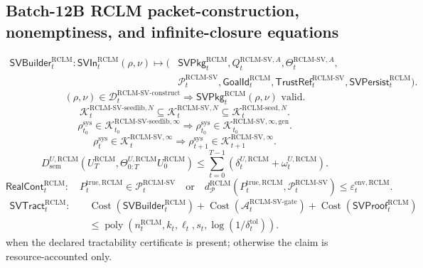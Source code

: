 \documentclass[11pt,a4paper]{article}
\newcommand{\Pcal}{\mathcal P}
\newcommand{\Acal}{\mathcal A}
\newcommand{\Kcal}{\mathcal K}
\newcommand{\Dcal}{\mathcal D}
\newcommand{\RCLM}{\mathrm{RCLM}}
\newcommand{\sem}{\mathrm{sem}}
\newcommand{\sys}{\mathrm{sys}}
\newcommand{\true}{\mathrm{true}}
\newcommand{\Cost}{\operatorname{Cost}}
\newcommand{\gate}{\mathrm{gate}}
\begin{document}
\subsection*{Batch-12B RCLM packet-construction, nonemptiness, and infinite-closure equations}
\[
\begin{aligned}
\mathsf{SVBuilder}_t^{\RCLM}:
\mathsf{SVIn}_t^{\RCLM}(\rho,\nu)
\mapsto
(&\mathsf{SVPkg}_t^{\RCLM},Q_t^{\RCLM\text{-}\mathrm{SV},A},
\Theta_t^{\RCLM\text{-}\mathrm{SV},A},\\
&\Pcal_t^{\RCLM\text{-}\mathrm{SV}},
\mathsf{GoalId}_t^{\RCLM},
\mathsf{TrustRef}_t^{\RCLM\text{-}\mathrm{SV}},
\mathsf{SVPersist}_t^{\RCLM}).
\end{aligned}
\]
\[
(\rho,\nu)\in\Dcal_t^{\RCLM\text{-}\mathrm{SV\mbox{-}construct}}
\Longrightarrow
\mathsf{SVPkg}_t^{\RCLM}(\rho,\nu)\text{ valid}.
\]
\[
\Kcal_t^{\RCLM\text{-}\mathrm{SV\mbox{-}seedlib},N}
\subseteq
\Kcal_t^{\RCLM\text{-}\mathrm{SV},N}
\subseteq
\Kcal_t^{\RCLM\text{-}\mathrm{seed},N}.
\]
\[
\rho_{t_0}^{\sys}\in\Kcal_{t_0}^{\RCLM\text{-}\mathrm{SV\mbox{-}seedlib},\infty}
\Longrightarrow
\rho_{t_0}^{\sys}\in\Kcal_{t_0}^{\RCLM\text{-}\mathrm{SV},\infty,\mathrm{gen}}.
\]
\[
\rho_t^{\sys}\in\Kcal_t^{\RCLM\text{-}\mathrm{SV},\infty}
\Longrightarrow
\rho_{t+1}^{\sys}\in\Kcal_{t+1}^{\RCLM\text{-}\mathrm{SV},\infty}.
\]
\[
D_{\sem}^{U,\RCLM}(U_T^{\RCLM},\Theta_{0:T}^{U,\RCLM}U_0^{\RCLM})
\le
\sum_{t=0}^{T-1}(\delta_t^{U,\RCLM}+\omega_t^{U,\RCLM}).
\]
\[
\mathsf{RealCont}_t^{\RCLM}:
\quad
P_t^{\true,\RCLM}\in\Pcal_t^{\RCLM\text{-}\mathrm{SV}}
\quad\text{or}\quad
 d_{\Pcal}^{\RCLM}(P_t^{\true,\RCLM},\Pcal_t^{\RCLM\text{-}\mathrm{SV}})\le\varepsilon_t^{\mathrm{env},\RCLM}.
\]
\[
\begin{aligned}
\mathsf{SVTract}_t^{\RCLM}:\quad
&\Cost(\mathsf{SVBuilder}_t^{\RCLM})+
\Cost(\Acal_t^{\RCLM\text{-}\mathrm{SV}\text{-}\gate})+
\Cost(\mathsf{SVProof}_t^{\RCLM})\\
&\le
\operatorname{poly}(n_t^{\RCLM},k_t,\ell_t,s_t,\log(1/\delta_t^{\mathrm{tol}})).
\end{aligned}
\]
when the declared tractability certificate is present; otherwise the claim is resource-accounted only.
\end{document}
